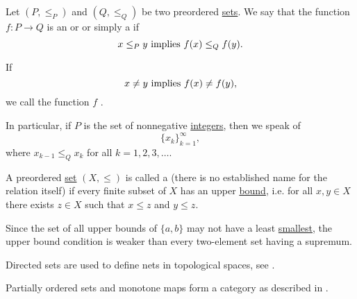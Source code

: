 \begin{definition}\label{def:monotone_map}
  Let \( (P, \leq_P) \) and \( (Q, \leq_Q) \) be two preordered \hyperref[def:preordered_set]{sets}. We say that the function \( f: P \to Q \) is an  or  or simply a  if
  \begin{equation*}
    x \leq_P y \text{ implies } f(x) \leq_Q f(y).
  \end{equation*}

  If
  \begin{equation*}
    x \neq y \text{ implies } f(x) \neq f(y),
  \end{equation*}
  we call the function \( f \) .

  In particular, if \( P \) is the set of nonnegative \hyperref[def:integers]{integers}, then we speak of 
  \begin{equation*}
    \{ x_k \}_{k=1}^\infty,
  \end{equation*}
  where \( x_{k-1} \leq_Q x_k \) for all \( k = 1, 2, 3, \ldots \).
\end{definition}

\begin{definition}\label{def:directed_set}\cite[8]{Engelking1989}
  A preordered \hyperref[def:preordered_set]{set} \( (X, \leq) \) is called a  (there is no established name for the relation itself) if every finite subset of \( X \) has an upper \hyperref[def:preordered_set/upper_lower_bound]{bound}, i.e. for all \( x, y \in X \) there exists \( z \in X \) such that \( x \leq z \) and \( y \leq z \).

  Since the set of all upper bounds of \( \{ a, b \} \) may not have a least \hyperref[def:preordered_set/largest_smallest_element]{smallest}, the upper bound condition is weaker than every two-element set having a supremum.

  Directed sets are used to define nets in topological spaces, see .
\end{definition}

\begin{definition}\label{def:category_of_preordered_sets}
  Partially ordered sets and monotone maps form a category as described in .
\end{definition}
